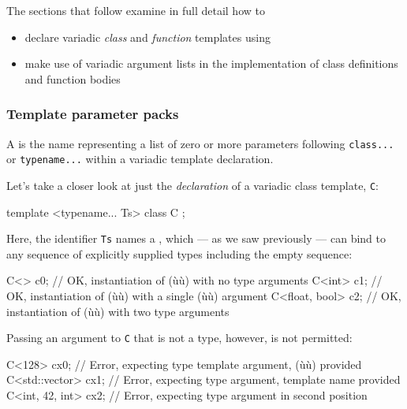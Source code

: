 \noindent The sections that follow examine in full detail how to
\begin{itemize}
\item{declare variadic \emph{class} and \emph{function} templates using }
\item{make use of variadic argument lists in the implementation of class definitions and function bodies}
\end{itemize}

\subsubsection[Template parameter packs]{Template parameter packs}\label{template-parameter-packs}

A  is the name representing a list of
zero or more parameters following \lstinline!class...! or
\lstinline!typename...! within a variadic template declaration.

Let's take a closer look at just the \emph{declaration} of a variadic
class template, \lstinline!C!:

\begin{emcppslisting}[emcppsbatch=e8]
template <typename... Ts> class C { };
\end{emcppslisting}
    

\noindent Here, the identifier \lstinline!Ts! names a , which --- as we saw previously --- can bind to any sequence of
explicitly supplied types including the empty sequence:

\begin{emcppslisting}[emcppsbatch=e8]
C<> c0;             // OK, instantiation of (ù{}ù) with no type arguments
C<int> c1;          // OK, instantiation of (ù{}ù) with a single (ù{}ù) argument
C<float, bool> c2;  // OK, instantiation of (ù{}ù) with two type arguments
\end{emcppslisting}
    

\noindent Passing an argument to \lstinline!C! that is not a type, however, is not
permitted:

\begin{emcppslisting}
C<128> cx0;           // Error, expecting type template argument, (ù{}ù) provided
C<std::vector> cx1;   // Error, expecting type argument, template name provided
C<int, 42, int> cx2;  // Error, expecting type argument in second position
\end{emcppslisting}
    

